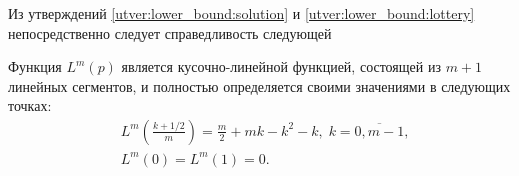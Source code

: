 Из утверждений \ref{utver:lower_bound:solution} и \ref{utver:lower_bound:lottery} непосредственно следует справедливость следующей

\begin{lemma}
\label{lemma:lower_bound:function}
Функция $ L^m(p) $ является кусочно-линейной функцией, состоящей из $ m + 1 $ линейных сегментов, и полностью определяется своими значениями в следующих точках:
\begin{eqnarray*}
  & L^m\left(\frac{k+1/2}{m}\right) 
      = \frac{m}{2} + mk - k^2 - k, 
          \; k = \overline{0, m - 1}, \\
  & L^m(0) = L^m(1) = 0.
\end{eqnarray*}
\end{lemma}